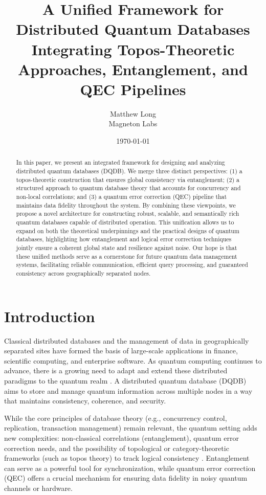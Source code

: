 \documentclass[11pt]{article}
\title{\textbf{A Unified Framework for Distributed Quantum Databases\\
\vspace{0.5cm}
\large Integrating Topos-Theoretic Approaches, Entanglement, and QEC Pipelines}}
\author{Matthew Long \\
\small Magneton Labs}
\date{\today}
\begin{document}
\maketitle

\begin{abstract}
In this paper, we present an integrated framework for designing and analyzing distributed quantum databases (DQDB). We merge three distinct perspectives: (1) a topos-theoretic construction that ensures global consistency via entanglement; (2) a structured approach to quantum database theory that accounts for concurrency and non-local correlations; and (3) a quantum error correction (QEC) pipeline that maintains data fidelity throughout the system. By combining these viewpoints, we propose a novel architecture for constructing robust, scalable, and semantically rich quantum databases capable of distributed operation. This unification allows us to expand on both the theoretical underpinnings and the practical designs of quantum databases, highlighting how entanglement and logical error correction techniques jointly ensure a coherent global state and resilience against noise. Our hope is that these unified methods serve as a cornerstone for future quantum data management systems, facilitating reliable communication, efficient query processing, and guaranteed consistency across geographically separated nodes.
\end{abstract}

\section{Introduction}
Classical distributed databases and the management of data in geographically separated sites have formed the basis of large-scale applications in finance, scientific computing, and enterprise software. As quantum computing continues to advance, there is a growing need to adapt and extend these distributed paradigms to the quantum realm \cite{nielsen_chuang, verstraete_review}. A distributed quantum database (DQDB) aims to store and manage quantum information across multiple nodes in a way that maintains consistency, coherence, and security.

While the core principles of database theory (e.g., concurrency control, replication, transaction management) remain relevant, the quantum setting adds new complexities: non-classical correlations (entanglement), quantum error correction needs, and the possibility of topological or category-theoretic frameworks (such as topos theory) to track logical consistency \cite{abramsky, heunen}. Entanglement can serve as a powerful tool for synchronization, while quantum error correction (QEC) offers a crucial mechanism for ensuring data fidelity in noisy quantum channels or hardware. 
\end{document}
